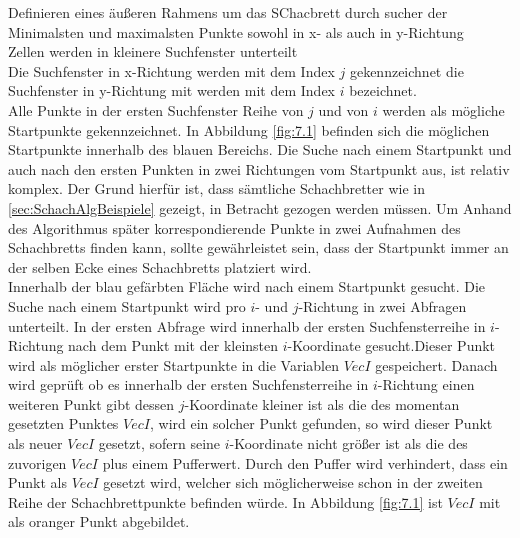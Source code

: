 Definieren eines äußeren Rahmens um das SChacbrett durch sucher der Minimalsten und maximalsten Punkte sowohl in x- als auch in y-Richtung\\

Zellen werden in kleinere Suchfenster unterteilt\\

Die Suchfenster in x-Richtung werden mit dem Index $j$ gekennzeichnet die Suchfenster in y-Richtung mit werden mit dem Index $i$ bezeichnet. \\

Alle Punkte in der ersten Suchfenster Reihe von $j$ und von $i$ werden als mögliche Startpunkte gekennzeichnet. In Abbildung \ref{fig:7.1} befinden sich die möglichen Startpunkte innerhalb des blauen Bereichs. Die Suche nach einem Startpunkt und auch nach den ersten Punkten in zwei Richtungen vom Startpunkt aus, ist relativ komplex. Der Grund hierfür ist, dass sämtliche Schachbretter wie in \ref{sec:SchachAlgBeispiele} gezeigt, in Betracht gezogen werden müssen. Um Anhand des Algorithmus später korrespondierende Punkte in zwei Aufnahmen des Schachbretts finden kann, sollte gewährleistet sein, dass der Startpunkt immer an der selben Ecke eines Schachbretts platziert wird.\\

Innerhalb der blau gefärbten Fläche wird nach einem Startpunkt gesucht. Die Suche nach einem Startpunkt wird pro $i$- und $j$-Richtung in zwei Abfragen unterteilt. In der ersten Abfrage wird innerhalb der ersten Suchfensterreihe in $i$-Richtung nach dem Punkt mit der kleinsten $i$-Koordinate gesucht.Dieser Punkt wird als möglicher erster Startpunkte in die Variablen $VecI$ gespeichert. Danach wird geprüft ob es innerhalb der ersten Suchfensterreihe in $i$-Richtung einen weiteren Punkt gibt dessen $j$-Koordinate kleiner ist als die des momentan gesetzten Punktes $VecI$, wird ein solcher Punkt gefunden, so wird dieser Punkt als neuer $VecI$ gesetzt, sofern seine $i$-Koordinate nicht größer ist als die des zuvorigen $VecI$ plus einem Pufferwert. Durch den Puffer wird verhindert, dass ein Punkt als $VecI$ gesetzt wird, welcher sich möglicherweise schon in der zweiten Reihe der Schachbrettpunkte befinden würde. In Abbildung \ref{fig:7.1} ist $VecI$ mit als oranger Punkt abgebildet.\\

